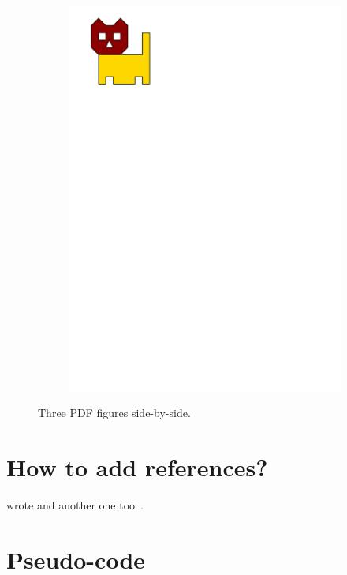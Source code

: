 \begin{figure}
\begin{subfigure}[b]{0.2\linewidth}
    \includegraphics[page=3,width=\linewidth]{figs/tricat.pdf}
    \caption{}\label{fig:pdffig:3}
  \end{subfigure}%
  \caption{Three PDF figures side-by-side.}\label{fig:pdffig}
\end{figure}



\section{How to add references?}

\citet{Descartes37} wrote and another one too~\citep{Voronoi08,Delaunay34}.


\section{Pseudo-code}

